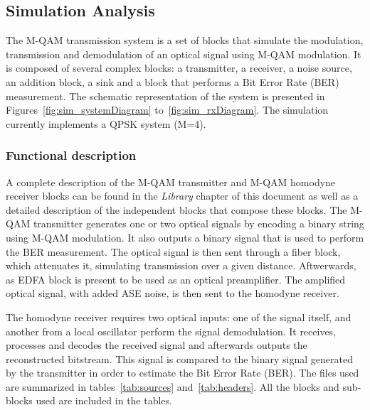 
	\subsection{Simulation Analysis}
	The M-QAM transmission system is a set of blocks that simulate the
	modulation, transmission and demodulation of an optical signal using M-QAM
	modulation. It is composed of several complex blocks: a transmitter, a
	receiver, a noise source, an addition block, a sink and a block that performs a Bit Error Rate (BER) measurement.
	The schematic representation of the system is presented in
	Figures~\ref{fig:sim_systemDiagram} to~\ref{fig:sim_rxDiagram}. The 
	simulation currently implements a QPSK system (M=4).

	\subsubsection{Functional description}
	A complete description of the M-QAM transmitter and M-QAM homodyne receiver
	blocks can be found in the \textit{Library} chapter of this document as well as
	a detailed description of the independent blocks that compose these blocks.
	The M-QAM transmitter generates one or two optical signals by encoding a binary
	string using M-QAM modulation. It also outputs a binary signal that is used to
	perform the BER measurement. The optical signal is then sent through a fiber 
	block, which attenuates it, simulating transmission over a given distance. 
	Aftwerwards, as EDFA block is present to be used as an optical preamplifier. 
	The amplified optical signal, with added ASE noise, is then sent to the 
	homodyne receiver.

	
	The homodyne receiver requires two optical inputs: one of the signal itself, 
	and another from a local oscillator perform the signal demodulation. It 
	receives, processes and decodes the received signal and afterwards outputs 
	the reconstructed bitstream. 
	This signal is compared to the binary signal generated by the
	transmitter in order to estimate the Bit Error Rate (BER).
	The files used are summarized in tables~\ref{tab:sources} and~\ref{tab:headers}.
	All the blocks and sub-blocks used are included in the tables.

